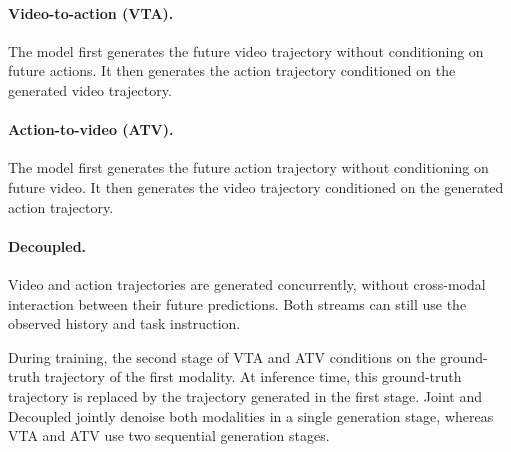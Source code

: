 \paragraph{Video-to-action (VTA).}
The model first generates the future video trajectory without
conditioning on future actions. It then generates the action
trajectory conditioned on the generated video trajectory.

\paragraph{Action-to-video (ATV).}
The model first generates the future action trajectory without
conditioning on future video. It then generates the video trajectory
conditioned on the generated action trajectory.

\paragraph{Decoupled.}
Video and action trajectories are generated concurrently, without
cross-modal interaction between their future predictions. Both
streams can still use the observed history and task instruction.

During training, the second stage of VTA and ATV conditions on the ground-truth trajectory of the first modality. 
At inference time, this ground-truth trajectory is replaced by the trajectory generated in the first stage. 
Joint and Decoupled jointly denoise both modalities in a single generation stage, whereas VTA and ATV use two sequential generation stages.




